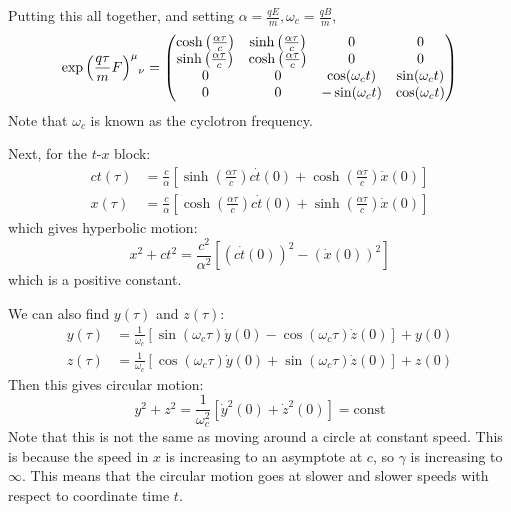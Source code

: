 \documentclass[../Main.tex]{subfiles}
\begin{document}
Putting this all together, and setting $\alpha = \frac{qE}{m}, \omega_c = \frac{qB}{m}$,
\begin{equation*}
    \indx{\exp\left(\frac{q\tau}{m} F\right)}\mu\nu =
    \begin{pmatrix}
        \cosh\left(\frac{\alpha\tau}{c}\right) & \sinh\left(\frac{\alpha\tau}{c}\right) & 0 & 0 \\
        \sinh\left(\frac{\alpha\tau}{c}\right) & \cosh\left(\frac{\alpha\tau}{c}\right) & 0 & 0 \\
        0 & 0 & \cos(\omega_ct) & \sin(\omega_ct) \\
        0 & 0 & -\sin(\omega_ct) & \cos(\omega_ct)
    \end{pmatrix}
\end{equation*}
Note that $\omega_c$ is known as the cyclotron frequency.

Next, for the $t$-$x$ block:
\begin{align*}
    ct(\tau) &= \frac{c}{\alpha} \left[\sinh\left(\frac{\alpha\tau}{c}\right) c\dot{t}(0) + \cosh\left(\frac{\alpha\tau}{c}\right)\dot{x}(0)\right] \\
    x(\tau) &= \frac{c}{\alpha} \left[\cosh\left(\frac{\alpha\tau}{c}\right) c\dot{t}(0) + \sinh\left(\frac{\alpha\tau}{c}\right)\dot{x}(0)\right]    
\end{align*}
which gives hyperbolic motion:
\begin{equation*}
    x^2 + ct^2 = \frac{c^2}{\alpha^2} \left[\left(c\dot{t}(0)\right)^2 - \left(\dot{x}(0)\right)^2\right]
\end{equation*}
which is a positive constant.

We can also find $y(\tau)$ and $z(\tau)$:
\begin{align*}
    y(\tau) &= \frac1{\omega_c} \left[\sin(\omega_c \tau) \dot{y}(0) - \cos(\omega_c \tau) \dot{z}(0)\right] + y(0) \\
    z(\tau) &= \frac1{\omega_c} \left[\cos(\omega_c \tau) \dot{y}(0) + \sin(\omega_c \tau) \dot{z}(0)\right] + z(0)
\end{align*}
Then this gives circular motion:
\begin{equation*}
    y^2 + z^2 = \frac1{\omega_c^2} \left[\dot{y}^2(0) + \dot{z}^2(0)\right] = \text{const}
\end{equation*}
Note that this is not the same as moving around a circle at constant speed. This is because the speed in $x$ is increasing to an asymptote at $c$, so $\gamma$ is increasing to $\infty$. This means that the circular motion goes at slower and slower speeds with respect to coordinate time $t$.
\end{document}
